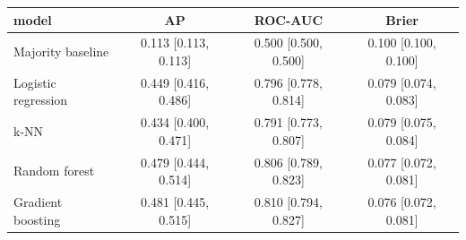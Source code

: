 \begin{tabular}{lccc}
\toprule
model & AP & ROC-AUC & Brier \\
\midrule
Majority baseline & 0.113 [0.113, 0.113] & 0.500 [0.500, 0.500] & 0.100 [0.100, 0.100] \\
Logistic regression & 0.449 [0.416, 0.486] & 0.796 [0.778, 0.814] & 0.079 [0.074, 0.083] \\
k-NN & 0.434 [0.400, 0.471] & 0.791 [0.773, 0.807] & 0.079 [0.075, 0.084] \\
Random forest & 0.479 [0.444, 0.514] & 0.806 [0.789, 0.823] & 0.077 [0.072, 0.081] \\
Gradient boosting & 0.481 [0.445, 0.515] & 0.810 [0.794, 0.827] & 0.076 [0.072, 0.081] \\
\bottomrule
\end{tabular}